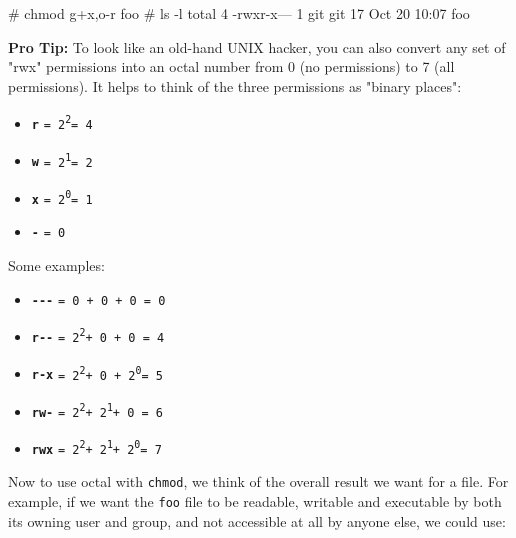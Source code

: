 \documentclass[10pt,american,]{book}
\newenvironment{Shaded}{\begin{snugshade}}{\end{snugshade}}
\newcommand{\KeywordTok}[1]{\textcolor[rgb]{0.13,0.29,0.53}{\textbf{{#1}}}}
\newcommand{\CommentTok}[1]{\textcolor[rgb]{0.56,0.35,0.01}{\textit{{#1}}}}
\newcommand{\NormalTok}[1]{{#1}}
\providecommand{\tightlist}{%
  \setlength{\itemsep}{0pt}\setlength{\parskip}{0pt}}
\numberwithin{figure}{chapter}
\renewcommand{\KeywordTok}[1]{{#1}}
\renewcommand{\CommentTok}[1]{{#1}}
\renewcommand{\NormalTok}[1]{{#1}}
\begin{document}
\begin{Shaded}
\begin{Highlighting}[]
\CommentTok{# chmod g+x,o-r foo}
\CommentTok{# ls -l}
\KeywordTok{total} \NormalTok{4}
\KeywordTok{-rwxr-x---} \NormalTok{1 git git 17 Oct 20 10:07 foo}
\end{Highlighting}
\end{Shaded}

\textbf{Pro Tip:} To look like an old-hand UNIX hacker, you can also
convert any set of "rwx" permissions into an octal number from 0 (no
permissions) to 7 (all permissions). It helps to think of the three
permissions as "binary places":

\begin{itemize}
\tightlist
\item
  \textbf{\texttt{r}}
  \texttt{=\ 2}\textsuperscript{\texttt{2}}\texttt{=\ 4}
\item
  \textbf{\texttt{w}}
  \texttt{=\ 2}\textsuperscript{\texttt{1}}\texttt{=\ 2}
\item
  \textbf{\texttt{x}}
  \texttt{=\ 2}\textsuperscript{\texttt{0}}\texttt{=\ 1}
\item
  \textbf{\texttt{-}} \texttt{=\ 0}
\end{itemize}

Some examples:

\begin{itemize}
\tightlist
\item
  \textbf{\texttt{-\/-\/-}} \texttt{=\ 0\ +\ 0\ +\ 0\ =\ 0}
\item
  \textbf{\texttt{r-\/-}}
  \texttt{=\ 2}\textsuperscript{\texttt{2}}\texttt{+\ 0\ +\ 0\ =\ 4}
\item
  \textbf{\texttt{r-x}}
  \texttt{=\ 2}\textsuperscript{\texttt{2}}\texttt{+\ 0\ +\ 2}\textsuperscript{\texttt{0}}\texttt{=\ 5}
\item
  \textbf{\texttt{rw-}}
  \texttt{=\ 2}\textsuperscript{\texttt{2}}\texttt{+\ 2}\textsuperscript{\texttt{1}}\texttt{+\ 0\ =\ 6}
\item
  \textbf{\texttt{rwx}}
  \texttt{=\ 2}\textsuperscript{\texttt{2}}\texttt{+\ 2}\textsuperscript{\texttt{1}}\texttt{+\ 2}\textsuperscript{\texttt{0}}\texttt{=\ 7}
\end{itemize}

Now to use octal with \texttt{chmod}, we think of the overall result we
want for a file. For example, if we want the \texttt{foo} file to be
readable, writable and executable by both its owning user and group, and
not accessible at all by anyone else, we could use:
\end{document}

